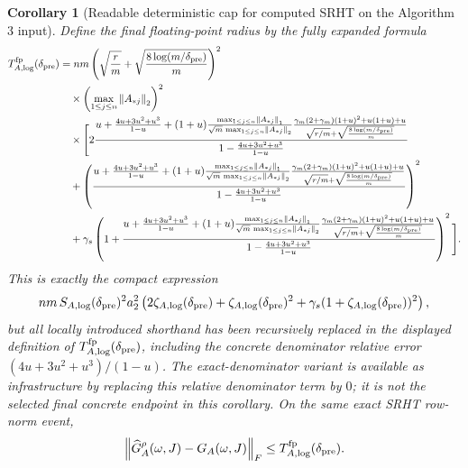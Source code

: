 \documentclass[11pt]{article}
\newcommand{\Frob}[1]{\left\lVert #1\right\rVert_F}
\newcommand{\Norm}[1]{\left\lVert #1\right\rVert_2}
\newcommand{\NormOne}[1]{\left\lVert #1\right\rVert_1}
\newtheorem{corollary}[theorem]{Corollary}
\theoremstyle{remark}
\begin{document}
\begin{corollary}[Readable deterministic cap for computed SRHT on the Algorithm 3 input]
Define the final floating-point radius by the fully expanded formula
\[
\begin{aligned}
  T_{A,\log}^{\rm fp}(\delta_{\rm pre})
  &=
  nm
  \left(
    \sqrt{\frac rm}
    +
    \sqrt{\frac{8\log(m/\delta_{\rm pre})}{m}}
  \right)^2
  \\
  &\quad\times
  \left(\max_{1\le j\le n}\Norm{A_{*j}}\right)^2
  \\
  &\quad\times
  \Bigg[
    2
    \frac{
      u+\frac{4u+3u^2+u^3}{1-u}
      +
      (1+u)
      \frac{\max_{1\le j\le n}\NormOne{A_{*j}}}
           {\sqrt m\,\max_{1\le j\le n}\Norm{A_{*j}}}
      \frac{\gamma_m(2+\gamma_m)(1+u)^2+u(1+u)+u}
           {
             \sqrt{r/m}
             +
             \sqrt{\frac{8\log(m/\delta_{\rm pre})}{m}}
           }
    }{
      1-\frac{4u+3u^2+u^3}{1-u}
    }
  \\
  &\quad+
    \left(
    \frac{
      u+\frac{4u+3u^2+u^3}{1-u}
      +
      (1+u)
      \frac{\max_{1\le j\le n}\NormOne{A_{*j}}}
           {\sqrt m\,\max_{1\le j\le n}\Norm{A_{*j}}}
      \frac{\gamma_m(2+\gamma_m)(1+u)^2+u(1+u)+u}
           {
             \sqrt{r/m}
             +
             \sqrt{\frac{8\log(m/\delta_{\rm pre})}{m}}
           }
    }{
      1-\frac{4u+3u^2+u^3}{1-u}
    }
    \right)^2
  \\
  &\quad+
    \gamma_s
    \left(
      1+
      \frac{
        u+\frac{4u+3u^2+u^3}{1-u}
        +
        (1+u)
        \frac{\max_{1\le j\le n}\NormOne{A_{*j}}}
             {\sqrt m\,\max_{1\le j\le n}\Norm{A_{*j}}}
        \frac{\gamma_m(2+\gamma_m)(1+u)^2+u(1+u)+u}
             {
               \sqrt{r/m}
               +
               \sqrt{\frac{8\log(m/\delta_{\rm pre})}{m}}
             }
      }{
        1-\frac{4u+3u^2+u^3}{1-u}
      }
    \right)^2
  \Bigg].
\end{aligned}
\]
This is exactly the compact expression
\[
  nm\,S_{A,\log}(\delta_{\rm pre})^2a_2^2
  \left(
    2\zeta_{A,\log}(\delta_{\rm pre})
    +\zeta_{A,\log}(\delta_{\rm pre})^2
    +
    \gamma_s(1+\zeta_{A,\log}(\delta_{\rm pre}))^2
  \right),
\]
but all locally introduced shorthand has been recursively replaced in the
displayed definition of \(T_{A,\log}^{\rm fp}(\delta_{\rm pre})\), including
the concrete denominator relative error
\((4u+3u^2+u^3)/(1-u)\).  The exact-denominator variant is available as
infrastructure by replacing this relative denominator term by \(0\); it is not
the selected final concrete endpoint in this corollary.
On the same exact SRHT row-norm event,
\[
  \Frob{\widehat G_A^\rho(\omega,J)-G_A(\omega,J)}
  \le
  T_{A,\log}^{\rm fp}(\delta_{\rm pre}).
\]


\end{corollary}
\end{document}
